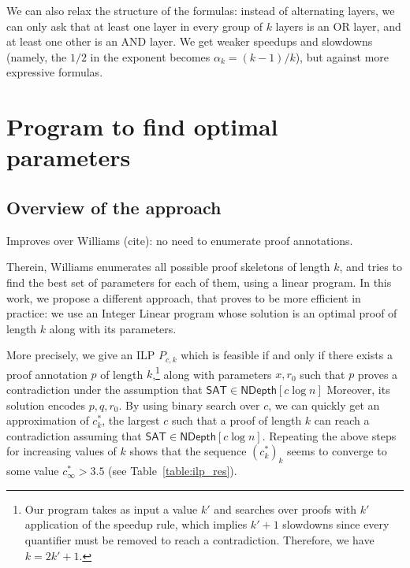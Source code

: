 \documentclass[a4paper, 11pt]{article}
\theoremstyle{plain}
\theoremstyle{definition}
\theoremstyle{remark}
\newcommand{\SAT}{\textsf{SAT}}%
\newcommand{\ND}{\textsf{NDepth}}%
\newcommand{\NDL}[1]{\ND\left[ #1 \log n\right]}%
\begin{document}
We can also relax the structure of the formulas: 
instead of alternating layers, we can only ask
that at least one layer in every group of $k$ layers
is an OR layer, and at least one other is an AND layer.
We get weaker speedups and slowdowns
(namely, the $1/2$ in the exponent becomes $\alpha_k = (k-1)/k$),
but against more expressive formulas. 


\appendix
\section{Program to find optimal parameters}\label{app:ilp}

\subsection{Overview of the approach}
Improves over Williams (cite): no need to enumerate proof annotations.

Therein, Williams enumerates all possible proof skeletons of length $k$,
and tries to find the best set of parameters for each of them, using a linear program.
In this work, we propose a different approach, that proves to be more efficient in practice:
we use an Integer Linear program whose solution is
an optimal proof of length $k$
along with its parameters.

More precisely, we give an ILP $P_{c,k}$ which is feasible if and only if
there exists a proof annotation $p$ of length $k$,\footnote{Our program takes as input a value $k'$ and searches over proofs with $k'$ application of the speedup rule, which implies $k'+1$ slowdowns since every quantifier must be removed to reach a contradiction. Therefore, we have $k = 2k'+1$.} along with parameters $x, r_0$
such that $p$ proves a contradiction under the assumption that $\SAT\in\NDL{c}$
Moreover, its solution encodes $p,q,r_0$.
By using binary search over $c$, we can quickly get an approximation 
of $c_k^*$, the largest $c$ such that a proof of length $k$ can reach a contradiction assuming that $\SAT\in\NDL{c}$.
Repeating the above steps for increasing values of $k$ shows that the sequence $(c_k^*)_{k}$
seems to converge to some value $c_\infty^* > 3.5$ (see Table~\ref{table:ilp_res}).
\end{document}
